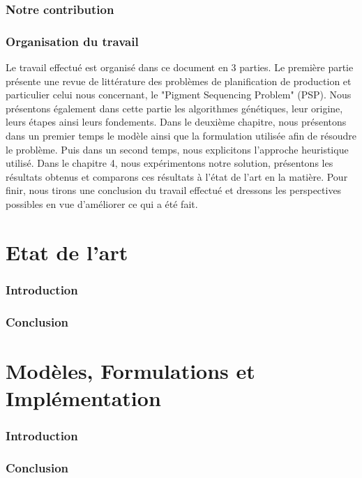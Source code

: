 \documentclass[12pt,a4paper]{article}
\begin{document}
	\section*{Notre contribution}
	
	\section*{Organisation du travail}

	Le travail effectué est organisé dans ce document en 3 parties. Le première partie présente une revue de littérature des problèmes de planification de production et particulier celui nous concernant, le "Pigment Sequencing Problem" (PSP). Nous présentons également dans cette partie les algorithmes génétiques, leur origine, leurs étapes ainsi leurs fondements. Dans le deuxième chapitre, nous présentons dans un premier temps le modèle ainsi que la formulation utilisée afin de résoudre le problème. Puis dans un second temps, nous explicitons l'approche heuristique utilisé. Dans le chapitre 4, nous expérimentons  notre solution, présentons les résultats obtenus et comparons ces résultats à l'état de l'art en la matière. Pour finir, nous tirons une conclusion du travail effectué et dressons les perspectives possibles en vue d'améliorer ce qui a été fait.
	
	\newpage
	
	\part{Etat de l'art}
		\section*{Introduction}
		\section*{Conclusion}
		
	\newpage
	
	\part{Modèles, Formulations et Implémentation}
		\section*{Introduction}
		\section*{Conclusion}
		
\end{document}
